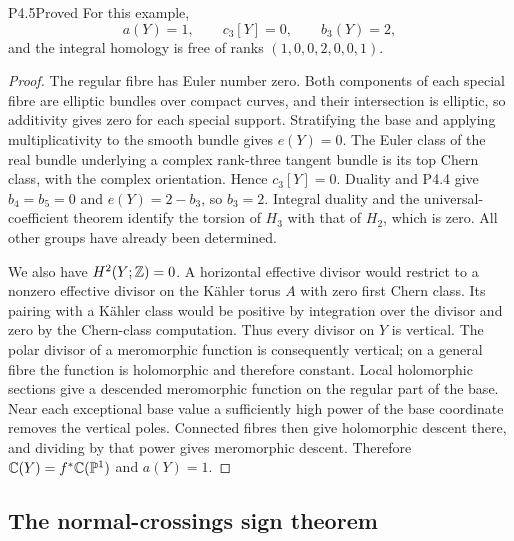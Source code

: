 \begin{statement}{P4.5}{Proved}
For this example,
\[
 a(Y)=1,\qquad c_3[Y]=0,\qquad b_3(Y)=2,
\]
and the integral homology is free of ranks $(1,0,0,2,0,0,1)$.
\end{statement}
\begin{proof}
The regular fibre has Euler number zero. Both components of each special
fibre are elliptic bundles over compact curves, and their intersection is
elliptic, so additivity gives zero for each special support. Stratifying
the base and applying multiplicativity to the smooth bundle gives
$e(Y)=0$. The Euler class of the real bundle underlying a complex
rank-three tangent bundle is its top Chern class, with the complex
orientation. Hence $c_3[Y]=0$. Duality and P4.4 give $b_4=b_5=0$ and
$e(Y)=2-b_3$, so $b_3=2$. Integral duality and the universal-coefficient
theorem identify the torsion of $H_3$ with that of $H_2$, which is zero.
All other groups have already been determined.

We also have $H^2(Y;\mathbb Z)=0$. A horizontal effective divisor would restrict
to a nonzero effective divisor on the Kähler torus $A$ with zero first
Chern class. Its pairing with a Kähler class would be positive by
integration over the divisor and zero by the Chern-class computation.
Thus every divisor on $Y$ is vertical. The polar divisor of a meromorphic
function is consequently vertical; on a general fibre the function is
holomorphic and therefore constant. Local holomorphic sections give a
descended meromorphic function on the regular part of the base. Near
each exceptional base value a sufficiently high power of the base
coordinate removes the vertical poles. Connected fibres then give
holomorphic descent there, and dividing by that power gives meromorphic
descent. Therefore $\mathbb C(Y)=f^*\mathbb C(\mathbb P^1)$ and $a(Y)=1$.
\end{proof}

\subsection{The normal-crossings sign theorem}

